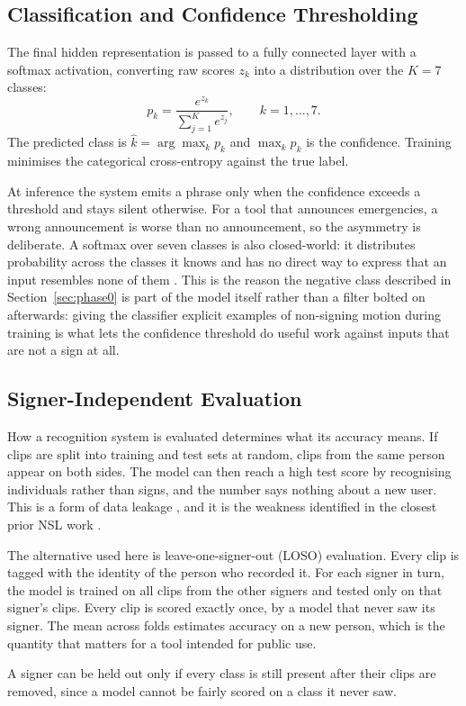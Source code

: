 \subsection{Classification and Confidence Thresholding}
The final hidden representation is passed to a fully connected layer with a softmax activation, converting raw scores $z_k$ into a distribution over the $K = 7$ classes:
\begin{equation}
    p_k = \frac{e^{z_k}}{\sum_{j=1}^{K} e^{z_j}}, \qquad k = 1,\dots,7.
\end{equation}
The predicted class is $\hat{k} = \arg\max_k p_k$ and $\max_k p_k$ is the confidence. Training minimises the categorical cross-entropy against the true label.

At inference the system emits a phrase only when the confidence exceeds a threshold and stays silent otherwise. For a tool that announces emergencies, a wrong announcement is worse than no announcement, so the asymmetry is deliberate. A softmax over seven classes is also closed-world: it distributes probability across the classes it knows and has no direct way to express that an input resembles none of them \cite{scheirer2013openset}. This is the reason the negative class described in Section~\ref{sec:phase0} is part of the model itself rather than a filter bolted on afterwards: giving the classifier explicit examples of non-signing motion during training is what lets the confidence threshold do useful work against inputs that are not a sign at all.

\subsection{Signer-Independent Evaluation}
How a recognition system is evaluated determines what its accuracy means. If clips are split into training and test sets at random, clips from the same person appear on both sides. The model can then reach a high test score by recognising individuals rather than signs, and the number says nothing about a new user. This is a form of data leakage \cite{kohavi1995crossval}, and it is the weakness identified in the closest prior NSL work \cite{shrestha2024nsl}.

The alternative used here is leave-one-signer-out (LOSO) evaluation. Every clip is tagged with the identity of the person who recorded it. For each signer in turn, the model is trained on all clips from the other signers and tested only on that signer's clips. Every clip is scored exactly once, by a model that never saw its signer. The mean across folds estimates accuracy on a new person, which is the quantity that matters for a tool intended for public use.

A signer can be held out only if every class is still present after their clips are removed, since a model cannot be fairly scored on a class it never saw.

